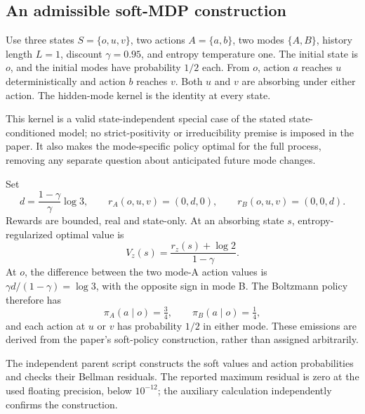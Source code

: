 \documentclass[10pt]{article}
\begin{document}
\subsection*{An admissible soft-MDP construction}
Use three states \(S=\{o,u,v\}\), two actions \(A=\{a,b\}\), two modes \(\{A,B\}\), history length \(L=1\), discount \(\gamma=0.95\), and entropy temperature one. The initial state is \(o\), and the initial modes have probability \(1/2\) each. From \(o\), action \(a\) reaches \(u\) deterministically and action \(b\) reaches \(v\). Both \(u\) and \(v\) are absorbing under either action. The hidden-mode kernel is the identity at every state.\par
This kernel is a valid state-independent special case of the stated state-conditioned model; no strict-positivity or irreducibility premise is imposed in the paper. It also makes the mode-specific policy optimal for the full process, removing any separate question about anticipated future mode changes.\par
Set \[d=\frac{1-\gamma}{\gamma}\log3,
\qquad
r_A(o,u,v)=(0,d,0),\qquad
r_B(o,u,v)=(0,0,d).\] Rewards are bounded, real and state-only. At an absorbing state \(s\), entropy-regularized optimal value is \[V_z(s)=\frac{r_z(s)+\log2}{1-\gamma}.\] At \(o\), the difference between the two mode-A action values is \(\gamma d/(1-\gamma)=\log3\), with the opposite sign in mode B. The Boltzmann policy therefore has \[\pi_A(a\mid o)=\tfrac34,\qquad
\pi_B(a\mid o)=\tfrac14,\] and each action at \(u\) or \(v\) has probability \(1/2\) in either mode. These emissions are derived from the paper’s soft-policy construction, rather than assigned arbitrarily.\par
The independent parent script constructs the soft values and action probabilities and checks their Bellman residuals. The reported maximum residual is zero at the used floating precision, below \(10^{-12}\); the auxiliary calculation independently confirms the construction.\par
\end{document}
